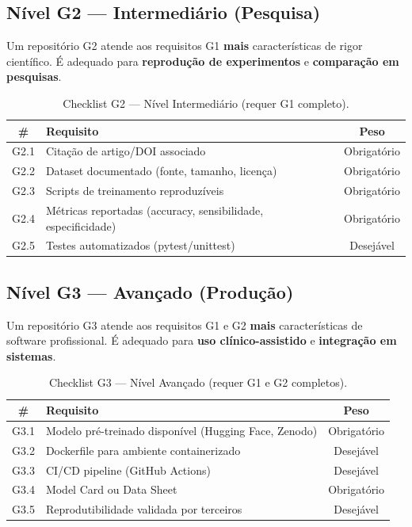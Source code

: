 \subsection{Nível G2 — Intermediário (Pesquisa)}

Um repositório G2 atende aos requisitos G1 \textbf{mais} características
de rigor científico. É adequado para \textbf{reprodução de experimentos}
e \textbf{comparação em pesquisas}.

\begin{table}[H]
  \centering
  \caption{Checklist G2 — Nível Intermediário (requer G1 completo).}
  \label{tab:g2-checklist}
  \begin{tabularx}{\textwidth}{cXc}
    \toprule
    \textbf{\#} & \textbf{Requisito} & \textbf{Peso} \\
    \midrule
    G2.1 & Citação de artigo/DOI associado & Obrigatório \\
    G2.2 & Dataset documentado (fonte, tamanho, licença) & Obrigatório \\
    G2.3 & Scripts de treinamento reproduzíveis & Obrigatório \\
    G2.4 & Métricas reportadas (accuracy, sensibilidade, especificidade) & Obrigatório \\
    G2.5 & Testes automatizados (pytest/unittest) & Desejável \\
    \bottomrule
  \end{tabularx}
\end{table}

\subsection{Nível G3 — Avançado (Produção)}

Um repositório G3 atende aos requisitos G1 e G2 \textbf{mais}
características de software profissional. É adequado para \textbf{uso
clínico-assistido} e \textbf{integração em sistemas}.

\begin{table}[H]
  \centering
  \caption{Checklist G3 — Nível Avançado (requer G1 e G2 completos).}
  \label{tab:g3-checklist}
  \begin{tabularx}{\textwidth}{cXc}
    \toprule
    \textbf{\#} & \textbf{Requisito} & \textbf{Peso} \\
    \midrule
    G3.1 & Modelo pré-treinado disponível (Hugging Face, Zenodo) & Obrigatório \\
    G3.2 & Dockerfile para ambiente containerizado & Desejável \\
    G3.3 & CI/CD pipeline (GitHub Actions) & Desejável \\
    G3.4 & Model Card ou Data Sheet & Obrigatório \\
    G3.5 & Reprodutibilidade validada por terceiros & Desejável \\
    \bottomrule
  \end{tabularx}
\end{table}

